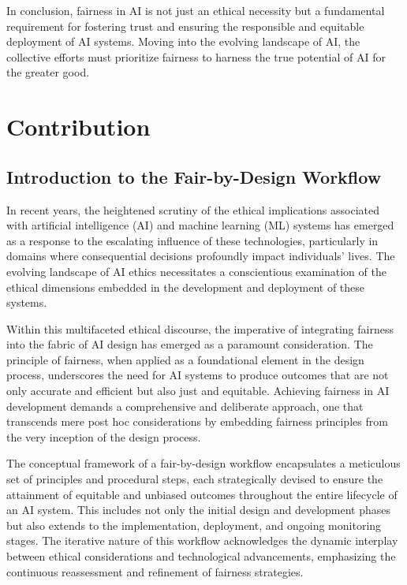\documentclass[12pt,a4paper,openright,twoside]{book}
\begin{document}
In conclusion, fairness in AI is not just an ethical necessity but a fundamental requirement for fostering trust and ensuring the responsible and equitable deployment of AI systems. Moving into the evolving landscape of AI, the collective efforts must prioritize fairness to harness the true potential of AI for the greater good.

%

\chapter{Contribution} %
\label{chap:contribution}

\section{Introduction to the Fair-by-Design Workflow}
\label{section:workflow-introduction}

In recent years, the heightened scrutiny of the ethical implications associated with artificial intelligence (AI) and machine learning (ML) systems has emerged as a response to the escalating influence of these technologies, particularly in domains where consequential decisions profoundly impact individuals' lives. The evolving landscape of AI ethics necessitates a conscientious examination of the ethical dimensions embedded in the development and deployment of these systems.

Within this multifaceted ethical discourse, the imperative of integrating fairness into the fabric of AI design has emerged as a paramount consideration. The principle of fairness, when applied as a foundational element in the design process, underscores the need for AI systems to produce outcomes that are not only accurate and efficient but also just and equitable. Achieving fairness in AI development demands a comprehensive and deliberate approach, one that transcends mere post hoc considerations by embedding fairness principles from the very inception of the design process.

The conceptual framework of a fair-by-design workflow encapsulates a meticulous set of principles and procedural steps, each strategically devised to ensure the attainment of equitable and unbiased outcomes throughout the entire lifecycle of an AI system. This includes not only the initial design and development phases but also extends to the implementation, deployment, and ongoing monitoring stages. The iterative nature of this workflow acknowledges the dynamic interplay between ethical considerations and technological advancements, emphasizing the continuous reassessment and refinement of fairness strategies.
\end{document}
